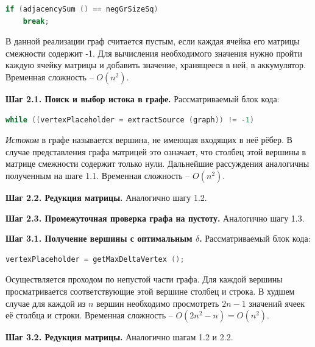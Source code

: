 \documentclass[spec, och, otchet, hidelinks]{SCWorks}
\begin{document}
\begin{lstlisting}[caption={Блок кода, отвечающий за поиск стока.},style=listingStyle, mathescape=true, language=C++]
if (adjacencySum () == negGrSizeSq)
	break;
\end{lstlisting}

В данной реализации граф считается пустым, если каждая ячейка 
его матрицы смежности содержит -1. Для вычисления необходимого значения нужно пройти каждую ячейку матрицы и добавить значение, хранящееся в ней, в 
аккумулятор. Временная сложность -- $O(n^2)$.

\par \textbf{Шаг 2.1. Поиск и выбор истока в графе.} Рассматриваемый блок кода:

\begin{lstlisting}[caption={Блок кода, отвечающий за поиск стока.},style=listingStyle, mathescape=true, language=C++]
while ((vertexPlaceholder = extractSource (graph)) != -1)
\end{lstlisting}
 
\textit{Истоком} в графе называется вершина, не имеющая входящих в неё рёбер. В случае представления графа матрицей это означает, что столбец этой 
вершины в матрице смежности содержит только нули. Дальнейшие рассуждения аналогичны полученным на шаге 1.1. Временная сложность -- $O(n^2)$.

\par \textbf{Шаг 2.2. Редукция матрицы.} Аналогично шагу 1.2.

\par \textbf{Шаг 2.3. Промежуточная проверка графа на пустоту.} Аналогично шагу 1.3.

\par \textbf{Шаг 3.1. Получение вершины с оптимальным $\delta$.} Рассматриваемый блок кода: 

\begin{lstlisting}[caption={Блок кода, отвечающий за поиск стока.},style=listingStyle, mathescape=true, language=C++]
vertexPlaceholder = getMaxDeltaVertex ();
\end{lstlisting}

Осуществляется проходом по непустой части графа. Для каждой вершины просматривается соответствующие этой вершине столбец и строка. В худшем случае 
для каждой из $n$ вершин необходимо просмотреть $2n - 1$ значений ячеек её столбца и строки. Временная сложность -- $O(2n^2 - n) = O(n^2)$.

\par \textbf{Шаг 3.2. Редукция матрицы.} Аналогично шагам 1.2 и 2.2.
\end{document}
